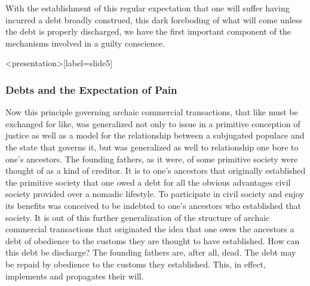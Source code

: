 With the establishment of this regular expectation that one will suffer having incurred a debt broadly construed, this dark foreboding of what will come unless the debt is properly discharged, we have the first important component of the mechanisms involved in a guilty conscience. \change

\begin{frame}<presentation>[label=slide5]
    \frametitle{Debts and the Expectation of Pain}
\end{frame}

Now this principle governing archaic commercial transactions, that like must be exchanged for like, was generalized not only to issue in a primitive conception of justice as well as a model for the relationship between a subjugated populace and the state that governs it, but was generalized as well to relationship one bore to one's ancestors. The founding fathers, as it were, of some primitive society were thought of as a kind of creditor. It is to one's ancestors that originally established the primitive society that one owed a debt for all the obvious advantages civil society provided over a nomadic lifestyle. To participate in civil society and enjoy its benefits was conceived to be indebted to one's ancestors who established that society. It is out of this further generalization of the structure of archaic commercial transactions that originated the idea that one owes the ancestors a debt of obedience to the customs they are thought to have established. How can this debt be discharge? The founding fathers are, after all, dead. The debt may be repaid by obedience to the customs they established. This, in effect, implements and propagates their will. \change

